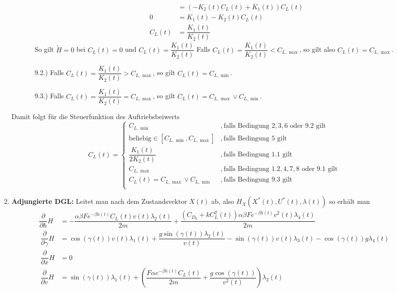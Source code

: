 \begin{enumerate}
\begin{enumerate}
\begin{enumerate}
\[\begin{split}
&= (- K_2(t) C_L(t) + K_1(t)) C_L(t) \\\
0 &= K_1(t) - K_2(t)C_L(t) \\\
C_L(t) &= \dfrac{K_1(t)}{K_2(t)}
\end{split}\]
So gilt $\tilde{H} = 0$ bei $C_L(t) = 0$ und $C_L(t) = \dfrac{K_1(t)}{K_2(t)}$ Falls $C_L(t) = \dfrac{K_1(t)}{K_2(t)} < C_{L,\max}$, so gilt also $C_L(t) = C_{L, \max}$.
%
\item[9.2.)] Falls $C_L(t) = \dfrac{K_1(t)}{K_2(t)} > C_{L,\max}$, so gilt $C_L(t) = C_{L,\min}$.
\item[9.3.)] Falls $C_L(t) = \dfrac{K_1(t)}{K_2(t)} = C_{L,\max}$, so gilt $C_L(t) = C_{L,\max} \vee C_{L,\min}$.
\end{enumerate}
\end{enumerate}
Damit folgt für die Steuerfunktion des Auftriebsbeiwerts
\[C_L(t) = \left\lbrace 
\begin{array}{ll}
C_{L, \min} & ,\text{falls Bedingung } 2,3,6 \text{ oder } 9.2 \text{ gilt} \\ 
\text{beliebig} \in [C_{L, \min},C_{L, \max}] & ,\text{falls Bedingung } 5 \text{ gilt} \\ 
\dfrac{K_1(t)}{2 K_2(t)} & ,\text{falls Bedingung } 1.1 \text{ gilt} \\ 
C_{L, \max} & ,\text{falls Bedingung } 1.2,4,7,8 \text{ oder } 9.1 \text{ gilt} \\
C_L(t) = C_{L,\max} \vee C_{L,\min} & ,\text{falls Bedingung } 9.3 \text{ gilt} \\ 
\end{array} 
\right.\]
%
\item \textbf{Adjungierte DGL:} Leitet man nach dem Zustandsvektor $X(t)$ ab, also $H_{X}(X^{\ast}(t),U^{\ast}(t),\lambda(t))$ so erhält man 
        \[\begin{split}
            \dfrac{\partial}{\partial h} H &= - \dfrac{\alpha \beta F e^{-\beta h(t)} C_L(t) v(t) \lambda_2(t)}{2m} + \dfrac{(C_{D_0}+k C_L^2(t)) \alpha \beta F e^{-\beta h(t)} v^2(t) \lambda_4(t)}{2m} \\\
            \dfrac{\partial}{\partial \gamma} H &= \cos(\gamma(t)) v(t) \lambda_1(t) + \dfrac{g \sin(\gamma(t)) \lambda_2(t)}{v(t)} - \sin(\gamma(t)) v(t) \lambda_3(t) - \cos(\gamma(t)) g \lambda_4(t) \\\
            \dfrac{\partial}{\partial x} H &= 0 \\\
            \dfrac{\partial}{\partial v} H &= \sin(\gamma(t)) \lambda_1(t) + \left( \dfrac{F \alpha e^{-\beta h(t)} C_L(t)}{2m} + \dfrac{g \cos(\gamma(t))}{v^2(t)} \right) \lambda_2(t) \\\

\end{split}\]
\end{enumerate}
